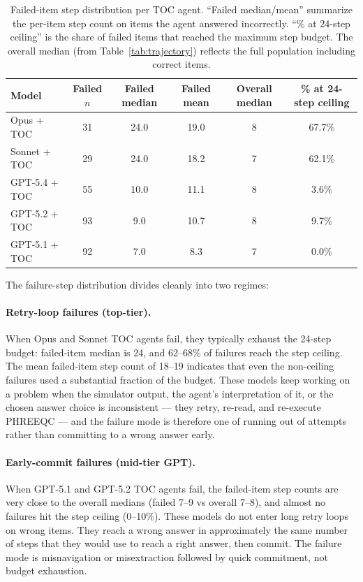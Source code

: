 \documentclass{article}
\begin{document}
\begin{table}[h]
\centering
\small
\setlength{\tabcolsep}{6pt}
\begin{tabular}{lccccc}
\toprule
Model & Failed $n$ & Failed median & Failed mean & Overall median & \% at 24-step ceiling \\
\midrule
Opus + TOC & 31 & 24.0 & 19.0 & 8 & 67.7\% \\
Sonnet + TOC & 29 & 24.0 & 18.2 & 7 & 62.1\% \\
GPT-5.4 + TOC & 55 & 10.0 & 11.1 & 8 & 3.6\% \\
GPT-5.2 + TOC & 93 & 9.0 & 10.7 & 8 & 9.7\% \\
GPT-5.1 + TOC & 92 & 7.0 & 8.3 & 7 & 0.0\% \\
\bottomrule
\end{tabular}
\caption{Failed-item step distribution per TOC agent. ``Failed median/mean'' summarize the per-item step count on items the agent answered incorrectly. ``\% at 24-step ceiling'' is the share of failed items that reached the maximum step budget. The overall median (from Table~\ref{tab:trajectory}) reflects the full population including correct items.}
\label{tab:appendix-failure-step-distribution}
\end{table}

The failure-step distribution divides cleanly into two regimes:

\paragraph{Retry-loop failures (top-tier).}
When Opus and Sonnet TOC agents fail, they typically exhaust the 24-step budget: failed-item median is 24, and 62--68\% of failures reach the step ceiling. The mean failed-item step count of 18--19 indicates that even the non-ceiling failures used a substantial fraction of the budget. These models keep working on a problem when the simulator output, the agent's interpretation of it, or the chosen answer choice is inconsistent --- they retry, re-read, and re-execute PHREEQC --- and the failure mode is therefore one of running out of attempts rather than committing to a wrong answer early.

\paragraph{Early-commit failures (mid-tier GPT).}
When GPT-5.1 and GPT-5.2 TOC agents fail, the failed-item step counts are very close to the overall medians (failed 7--9 vs overall 7--8), and almost no failures hit the step ceiling (0--10\%). These models do not enter long retry loops on wrong items. They reach a wrong answer in approximately the same number of steps that they would use to reach a right answer, then commit. The failure mode is misnavigation or misextraction followed by quick commitment, not budget exhaustion.
\end{document}
